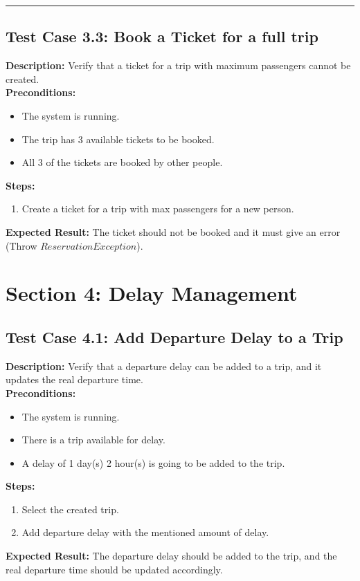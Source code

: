 \documentclass{article}
\begin{document}
\bigskip
\hrule
\bigskip

\subsection{Test Case 3.3: Book a Ticket for a full trip}

\textbf{Description:} Verify that a ticket for a trip with maximum passengers cannot be created.\\
\textbf{Preconditions:}
\begin{itemize}
  \item The system is running.
  \item The trip has 3 available tickets to be booked.
  \item All 3 of the tickets are booked by other people.  
\end{itemize}
\textbf{Steps:}
\begin{enumerate}
  \item Create a ticket for a trip with max passengers for a new person.
\end{enumerate}
\textbf{Expected Result:} The ticket should not be booked and it must give an error (Throw $ReservationException$).

\pagebreak

\section{Section 4: Delay Management}
\bigskip
\bigskip
\subsection{Test Case 4.1: Add Departure Delay to a Trip}

\textbf{Description:} Verify that a departure delay can be added to a trip, and it updates the real departure time.\\
\textbf{Preconditions:}
\begin{itemize}
  \item The system is running.
  \item There is a trip available for delay.
  \item A delay of 1 day(s) 2 hour(s) is going to be added to the trip.
\end{itemize}
\textbf{Steps:}
\begin{enumerate}
  \item Select the created trip.
  \item Add departure delay with the mentioned amount of delay.
\end{enumerate}
\textbf{Expected Result:} The departure delay should be added to the trip, and the real departure time should be updated accordingly.
\end{document}

